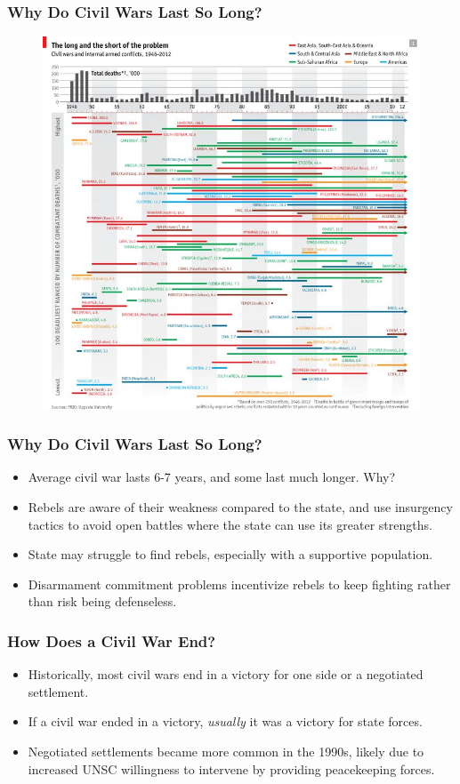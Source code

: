\documentclass[handout]{beamer}
\begin{document}
\begin{frame} 
	\frametitle{\LARGE{Why Do Civil Wars Last So Long?}}
	\begin{figure}[ht!]
		\centering
		\includegraphics[width=\textwidth,height=0.9\textheight,keepaspectratio]{civil war duration.jpg}
	\end{figure}
\end{frame}

\begin{frame} 
	\frametitle{\LARGE{Why Do Civil Wars Last So Long?}}
	\begin{itemize}
		\item Average civil war lasts 6-7 years, and some last much longer. Why? \pause
		\item Rebels are aware of their weakness compared to the state, and use insurgency tactics to avoid open battles where the state can use its greater strengths. \pause
		\item State may struggle to find rebels, especially with a supportive population. \pause
		\item Disarmament commitment problems incentivize rebels to keep fighting rather than risk being defenseless.
	\end{itemize}
\end{frame}

\begin{frame} 
	\frametitle{\LARGE{How Does a Civil War End?}}
	\begin{itemize}
		\item Historically, most civil wars end in a victory for one side or a negotiated settlement. \pause
		\item If a civil war ended in a victory, \textit{usually} it was a victory for state forces. \pause
		\item Negotiated settlements became more common in the 1990s, likely due to increased UNSC willingness to intervene by providing peacekeeping forces.	
	\end{itemize}
\end{frame}
\end{document}
